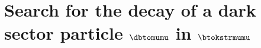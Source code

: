 \chapter
{Search for the decay of a dark sector particle
  \texorpdfstring{$\boldsymbol{\dbtomumu}$}{\dbtomumu} in
  \texorpdfstring{$\boldsymbol{\btokstrmumu}$}{\btokstrmumu}
}
\label{ch:db}





%


\clearpage

